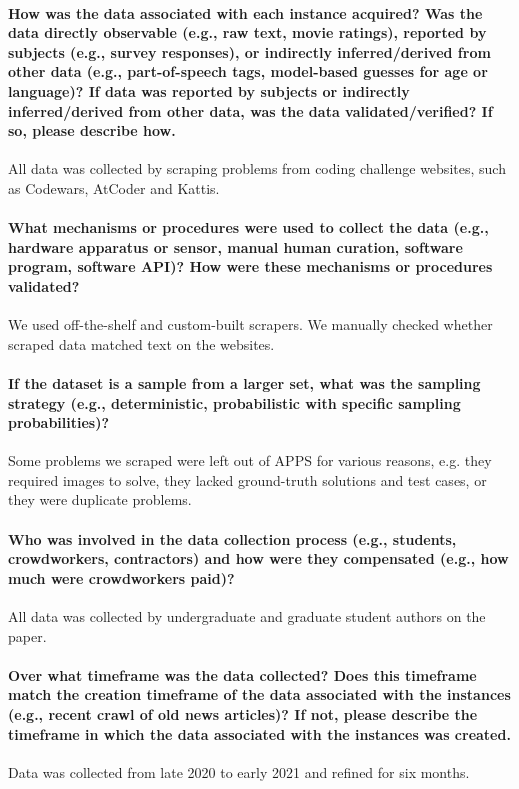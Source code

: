 \paragraph{How was the data associated with each instance acquired? Was
the data directly observable (e.g., raw text, movie ratings), reported by
subjects (e.g., survey responses), or indirectly inferred/derived from other
data (e.g., part-of-speech tags, model-based guesses for age or language)?
If data was reported by subjects or indirectly inferred/derived from other
data, was the data validated/verified? If so, please describe how.}
All data was collected by scraping problems from coding challenge websites, such as Codewars, AtCoder and Kattis.


\paragraph{What mechanisms or procedures were used to collect the data
(e.g., hardware apparatus or sensor, manual human curation, software program, software API)? How were these mechanisms or procedures validated?}
We used off-the-shelf and custom-built scrapers. We manually checked whether scraped data matched text on the websites.

\paragraph{If the dataset is a sample from a larger set, what was the sampling
strategy (e.g., deterministic, probabilistic with specific sampling
probabilities)?}
Some problems we scraped were left out of APPS for various reasons, e.g. they required images to solve, they lacked ground-truth solutions and test cases, or they were duplicate problems.

\paragraph{Who was involved in the data collection process (e.g., students,
crowdworkers, contractors) and how were they compensated (e.g.,
how much were crowdworkers paid)?}
All data was collected by undergraduate and graduate student authors on the paper.

\paragraph{Over what timeframe was the data collected? Does this timeframe
match the creation timeframe of the data associated with the instances
(e.g., recent crawl of old news articles)? If not, please describe the timeframe in which the data associated with the instances was created.}
Data was collected from late 2020 to early 2021 and refined for six months.

